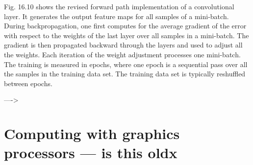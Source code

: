 \documentclass[7pt]{article}
\begin{document}
Fig. 16.10 shows the revised forward path implementation of a convolutional layer. It generates the output feature maps for all samples of a mini-batch. During backpropagation, one first computes for the average gradient of the error with respect to the weights of the last layer over all samples in a mini-batch. The gradient is then propagated backward through the layers and used to adjust all the weights. Each iteration of the weight adjustment processes one mini-batch. The training is measured in epochs, where one epoch is a sequential pass over all the samples in the training data set. The training data set is typically reshuffled between epochs.


---->




\newpage

\section{Computing with graphics processors --- is this oldx}
\end{document}
